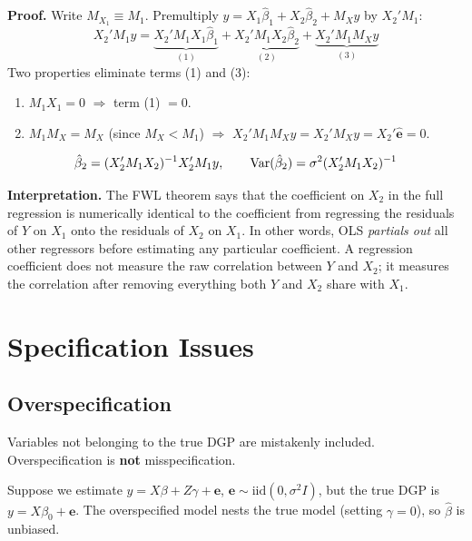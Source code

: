 \noindent\textbf{Proof.} Write $M_{X_1} \equiv M_1$.
Premultiply $y = X_1\hat\beta_1 + X_2\hat\beta_2 + M_Xy$ by $X_2'M_1$:
\begin{equation}
  X_2'M_1y
  = \underbrace{X_2'M_1X_1\hat\beta_1}_{(1)}
  + \underbrace{X_2'M_1X_2\hat\beta_2}_{(2)}
  + \underbrace{X_2'M_1M_Xy}_{(3)}
\end{equation}
Two properties eliminate terms (1) and (3):
\begin{enumerate}
  \item $M_1X_1 = 0$ $\Rightarrow$ term (1) $= 0$.
  \item $M_1M_X = M_X$ (since $M_X < M_1$) $\Rightarrow$
    $X_2'M_1M_Xy = X_2'M_Xy = X_2'\hat{\mathbf{e}} = 0$.
\end{enumerate}

\begin{tcolorbox}[keyresult]
\begin{equation}
  \hat\beta_2 = (X_2'M_1X_2)^{-1}X_2'M_1y,
  \qquad
  \operatorname{Var}(\hat\beta_2) = \sigma^2(X_2'M_1X_2)^{-1}
  \label{eq_FWL}
\end{equation}
\end{tcolorbox}

\noindent\textbf{Interpretation.} The FWL theorem says that the coefficient
on $X_2$ in the full regression is numerically identical to the coefficient
from regressing the residuals of $Y$ on $X_1$ onto the residuals of $X_2$
on $X_1$. In other words, OLS \emph{partials out} all other regressors before
estimating any particular coefficient. A regression coefficient does not
measure the raw correlation between $Y$ and $X_2$; it measures the
correlation after removing everything both $Y$ and $X_2$ share with $X_1$.


\section{Specification Issues}
\label{sec_Specification}

\subsection{Overspecification}

Variables not belonging to the true DGP are mistakenly included.
Overspecification is \textbf{not} misspecification.

Suppose we estimate $y = X\beta + Z\gamma + \mathbf{e}$,
$\mathbf{e}\sim\text{iid}(0,\sigma^2I)$, but the true DGP is
$y = X\beta_0 + \mathbf{e}$. The overspecified model nests the true model
(setting $\gamma=0$), so $\hat\beta$ is unbiased.

